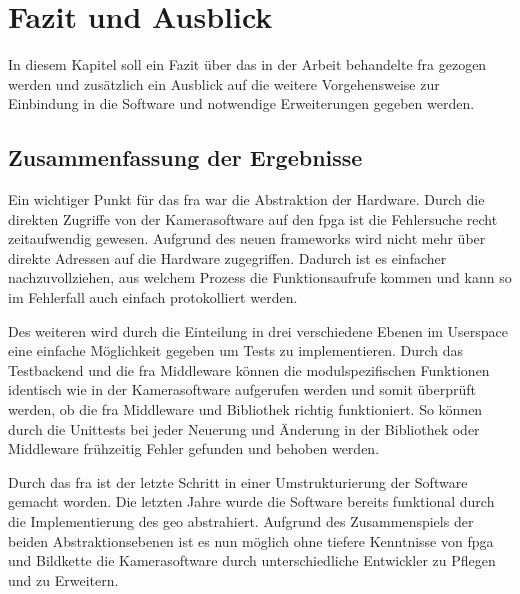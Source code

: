\chapter{Fazit und Ausblick}

In diesem Kapitel soll ein Fazit über das in der Arbeit behandelte \ac{fra} gezogen werden und zusätzlich ein Ausblick auf die weitere Vorgehensweise zur Einbindung in die Software und notwendige Erweiterungen gegeben werden.


\section{Zusammenfassung der Ergebnisse}

Ein wichtiger Punkt für das \ac{fra} war die Abstraktion der Hardware. Durch die direkten Zugriffe von der Kamerasoftware auf den \ac{fpga} ist die Fehlersuche recht zeitaufwendig gewesen. Aufgrund des neuen \glspl{framework} wird nicht mehr über direkte Adressen auf die Hardware zugegriffen. Dadurch ist es einfacher nachzuvollziehen, aus welchem Prozess die Funktionsaufrufe kommen und kann so im Fehlerfall auch einfach protokolliert werden.


Des weiteren wird durch die Einteilung in drei verschiedene Ebenen im Userspace eine einfache Möglichkeit gegeben um Tests zu implementieren. Durch das Testbackend und die \ac{fra} Middleware können die modulspezifischen Funktionen identisch wie in der Kamerasoftware aufgerufen werden und somit überprüft werden, ob die \ac{fra} Middleware und Bibliothek richtig funktioniert. So können durch die Unittests bei jeder Neuerung und Änderung in der Bibliothek oder Middleware frühzeitig Fehler gefunden und behoben werden.


Durch das \ac{fra} ist der letzte Schritt in einer Umstrukturierung der Software gemacht worden. Die letzten Jahre wurde die Software bereits funktional durch die Implementierung des \ac{geo} abstrahiert. Aufgrund des Zusammenspiels der beiden Abstraktionsebenen ist es nun möglich ohne tiefere Kenntnisse von \ac{fpga} und Bildkette die Kamerasoftware durch unterschiedliche Entwickler zu Pflegen und zu Erweitern.



